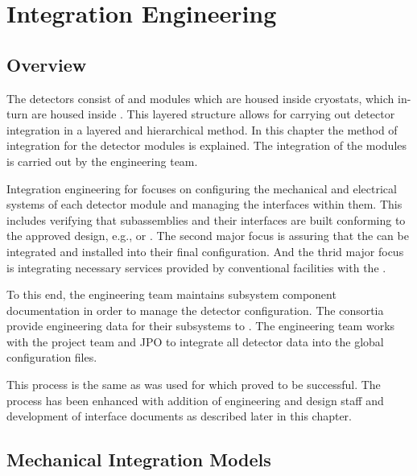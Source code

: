 \chapter{Integration Engineering}
\label{sec:fdsp-coord-integ-sysengr}

\section{Overview}
\label{sec:fdsp-overview}

The  detectors consist of  and 
modules which are housed inside cryostats, which in-turn are housed
inside . This layered structure allows for carrying out
detector integration in a layered and hierarchical method. In this
chapter the method of integration for the detector modules is
explained.  The integration of the modules is carried out by the
 engineering team.

Integration engineering for  focuses on configuring the
mechanical and electrical systems of each detector module and managing
the interfaces within them. This includes verifying that subassemblies
and their interfaces are built conforming to the approved design,
e.g.,  or  . The second major focus
is assuring that the  can be integrated and
installed into their final configuration. And the thrid major focus is
integrating necessary services provided by conventional facilities
with the .


To this end, the  engineering team maintains subsystem
component documentation in order to manage the detector
configuration. The consortia provide engineering data for their
subsystems to . The  engineering team works with
the  project team and JPO to integrate all detector
data into the global  configuration files.

This process is the same as was used for  which proved to be
successful. The process has been enhanced with addition of engineering
and design staff and development of interface documents as described
later in this chapter.

\section{Mechanical Integration Models}
\label{sec:fdsp-coord-integ-models}

